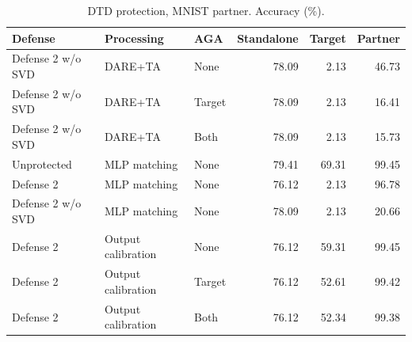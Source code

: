 \begin{table}[t]
\centering\small
\caption{DTD protection, MNIST partner. Accuracy (\%).}
\begin{tabular}{lllrrr}
\toprule
Defense & Processing & AGA & Standalone & Target & Partner \\
\midrule
Defense 2 w/o SVD & DARE+TA & None & 78.09 & 2.13 & 46.73 \\
Defense 2 w/o SVD & DARE+TA & Target & 78.09 & 2.13 & 16.41 \\
Defense 2 w/o SVD & DARE+TA & Both & 78.09 & 2.13 & 15.73 \\
Unprotected & MLP matching & None & 79.41 & 69.31 & 99.45 \\
Defense 2 & MLP matching & None & 76.12 & 2.13 & 96.78 \\
Defense 2 w/o SVD & MLP matching & None & 78.09 & 2.13 & 20.66 \\
Defense 2 & Output calibration & None & 76.12 & 59.31 & 99.45 \\
Defense 2 & Output calibration & Target & 76.12 & 52.61 & 99.42 \\
Defense 2 & Output calibration & Both & 76.12 & 52.34 & 99.38 \\
\bottomrule
\end{tabular}
\end{table}
